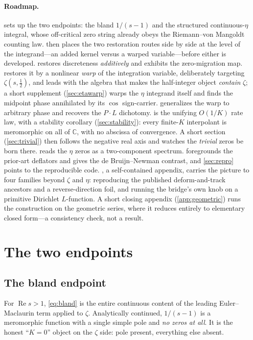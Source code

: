 \documentclass[11pt]{article}
\theoremstyle{definition}
\renewcommand{\Re}{\operatorname{Re}}
\begin{document}
\paragraph{Roadmap.}
 sets up the two endpoints: the bland $1/(s-1)$ and the
structured continuous-$\eta$ integral, whose off-critical zero string already
obeys the Riemann--von Mangoldt counting law.  then places
the two restoration routes side by side at the level of the integrand---an added
kernel versus a warped variable---before either is developed. 
restores discreteness \emph{additively} and exhibits the zero-migration map.
 restores it by a nonlinear \emph{warp} of the integration
variable, deliberately targeting $\zeta(s,\tfrac12)$, and leads with the algebra
that makes the half-integer object \emph{contain} $\zeta$; a short supplement
(\cref{sec:etawarp}) warps the $\eta$ integrand itself and finds the midpoint
phase annihilated by its $\cos$ sign-carrier. 
generalizes the warp to arbitrary phase and recovers the $P\cdot L$ dichotomy.
 is the unifying $O(1/K)$ rate law, with a stability corollary
(\cref{sec:stability}): every finite-$K$ interpolant is meromorphic on all of
$\mathbb{C}$, with no abscissa of convergence. A short section
(\cref{sec:trivial}) then follows the negative real axis and watches the
\emph{trivial} zeros be born there.  reads the
$\eta$ zeros as a two-component spectrum.  foregrounds the
prior-art deflators and gives the de Bruijn--Newman contrast, and
\cref{sec:repro} points to the reproducible code. , a
self-contained appendix, carries the picture to four families beyond $\zeta$ and
$\eta$: reproducing the published deform-and-track ancestors and a reverse-direction
foil, and running the bridge's own knob on a primitive Dirichlet $L$-function. A short
closing appendix (\cref{app:geometric}) runs the construction on the geometric series,
where it reduces entirely to elementary closed form---a consistency check, not a result.

\section{The two endpoints}\label{sec:endpoints}

\subsection{The bland endpoint}
For $\Re s>1$, \eqref{eq:bland} is the entire continuous content of the leading
Euler--Maclaurin term applied to $\zeta$. Analytically continued, $1/(s-1)$ is a
meromorphic function with a single simple pole and \emph{no zeros at all}. It is
the honest ``$K=0$'' object on the $\zeta$ side: pole present, everything else
absent.
\end{document}
